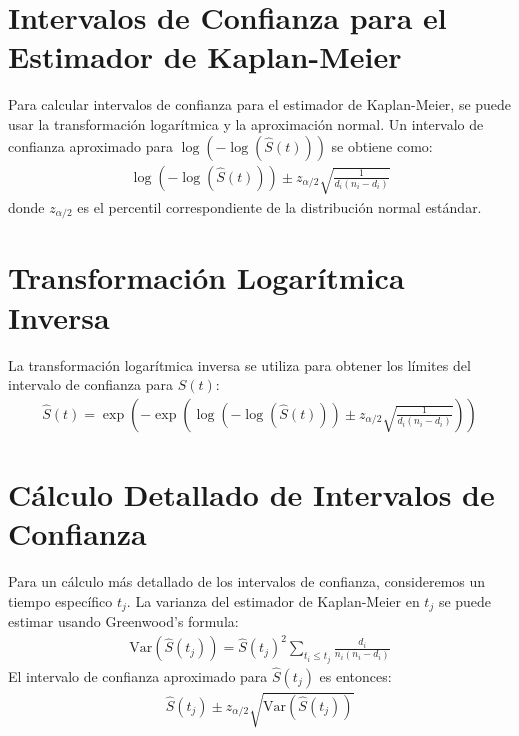 \documentclass[a4paper]{report} %
\begin{document}
\section{Intervalos de Confianza para el Estimador de Kaplan-Meier}
Para calcular intervalos de confianza para el estimador de Kaplan-Meier, se puede usar la transformaci\'on logar\'itmica y la aproximaci\'on normal. Un intervalo de confianza aproximado para $\log(-\log(\hat{S}(t)))$ se obtiene como:
\begin{eqnarray*}
\log(-\log(\hat{S}(t))) \pm z_{\alpha/2} \sqrt{\frac{1}{d_i(n_i - d_i)}}
\end{eqnarray*}
donde $z_{\alpha/2}$ es el percentil correspondiente de la distribuci\'on normal est\'andar.

\section{Transformaci\'on Logar\'itmica Inversa}
La transformaci\'on logar\'itmica inversa se utiliza para obtener los l\'imites del intervalo de confianza para $S(t)$:
\begin{eqnarray*}
\hat{S}(t) = \exp\left(-\exp\left(\log(-\log(\hat{S}(t))) \pm z_{\alpha/2} \sqrt{\frac{1}{d_i(n_i - d_i)}}\right)\right)
\end{eqnarray*}

\section{C\'alculo Detallado de Intervalos de Confianza}
Para un c\'alculo m\'as detallado de los intervalos de confianza, consideremos un tiempo espec\'ifico $t_j$. La varianza del estimador de Kaplan-Meier en $t_j$ se puede estimar usando Greenwood's formula:
\begin{eqnarray*}
\text{Var}(\hat{S}(t_j)) = \hat{S}(t_j)^2 \sum_{t_i \leq t_j} \frac{d_i}{n_i(n_i - d_i)}
\end{eqnarray*}
El intervalo de confianza aproximado para $\hat{S}(t_j)$ es entonces:
\begin{eqnarray*}
\hat{S}(t_j) \pm z_{\alpha/2} \sqrt{\text{Var}(\hat{S}(t_j))}
\end{eqnarray*}
\end{document}
